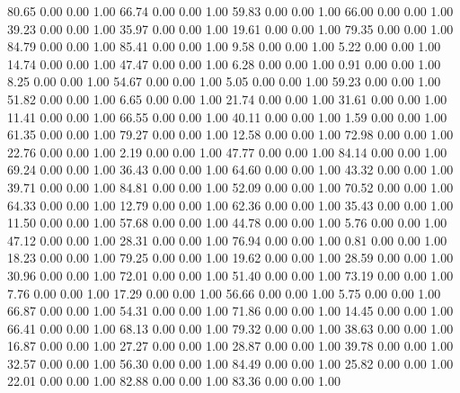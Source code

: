    80.65   0.00   0.00   1.00
   66.74   0.00   0.00   1.00
   59.83   0.00   0.00   1.00
   66.00   0.00   0.00   1.00
   39.23   0.00   0.00   1.00
   35.97   0.00   0.00   1.00
   19.61   0.00   0.00   1.00
   79.35   0.00   0.00   1.00
   84.79   0.00   0.00   1.00
   85.41   0.00   0.00   1.00
    9.58   0.00   0.00   1.00
    5.22   0.00   0.00   1.00
   14.74   0.00   0.00   1.00
   47.47   0.00   0.00   1.00
    6.28   0.00   0.00   1.00
    0.91   0.00   0.00   1.00
    8.25   0.00   0.00   1.00
   54.67   0.00   0.00   1.00
    5.05   0.00   0.00   1.00
   59.23   0.00   0.00   1.00
   51.82   0.00   0.00   1.00
    6.65   0.00   0.00   1.00
   21.74   0.00   0.00   1.00
   31.61   0.00   0.00   1.00
   11.41   0.00   0.00   1.00
   66.55   0.00   0.00   1.00
   40.11   0.00   0.00   1.00
    1.59   0.00   0.00   1.00
   61.35   0.00   0.00   1.00
   79.27   0.00   0.00   1.00
   12.58   0.00   0.00   1.00
   72.98   0.00   0.00   1.00
   22.76   0.00   0.00   1.00
    2.19   0.00   0.00   1.00
   47.77   0.00   0.00   1.00
   84.14   0.00   0.00   1.00
   69.24   0.00   0.00   1.00
   36.43   0.00   0.00   1.00
   64.60   0.00   0.00   1.00
   43.32   0.00   0.00   1.00
   39.71   0.00   0.00   1.00
   84.81   0.00   0.00   1.00
   52.09   0.00   0.00   1.00
   70.52   0.00   0.00   1.00
   64.33   0.00   0.00   1.00
   12.79   0.00   0.00   1.00
   62.36   0.00   0.00   1.00
   35.43   0.00   0.00   1.00
   11.50   0.00   0.00   1.00
   57.68   0.00   0.00   1.00
   44.78   0.00   0.00   1.00
    5.76   0.00   0.00   1.00
   47.12   0.00   0.00   1.00
   28.31   0.00   0.00   1.00
   76.94   0.00   0.00   1.00
    0.81   0.00   0.00   1.00
   18.23   0.00   0.00   1.00
   79.25   0.00   0.00   1.00
   19.62   0.00   0.00   1.00
   28.59   0.00   0.00   1.00
   30.96   0.00   0.00   1.00
   72.01   0.00   0.00   1.00
   51.40   0.00   0.00   1.00
   73.19   0.00   0.00   1.00
    7.76   0.00   0.00   1.00
   17.29   0.00   0.00   1.00
   56.66   0.00   0.00   1.00
    5.75   0.00   0.00   1.00
   66.87   0.00   0.00   1.00
   54.31   0.00   0.00   1.00
   71.86   0.00   0.00   1.00
   14.45   0.00   0.00   1.00
   66.41   0.00   0.00   1.00
   68.13   0.00   0.00   1.00
   79.32   0.00   0.00   1.00
   38.63   0.00   0.00   1.00
   16.87   0.00   0.00   1.00
   27.27   0.00   0.00   1.00
   28.87   0.00   0.00   1.00
   39.78   0.00   0.00   1.00
   32.57   0.00   0.00   1.00
   56.30   0.00   0.00   1.00
   84.49   0.00   0.00   1.00
   25.82   0.00   0.00   1.00
   22.01   0.00   0.00   1.00
   82.88   0.00   0.00   1.00
   83.36   0.00   0.00   1.00
